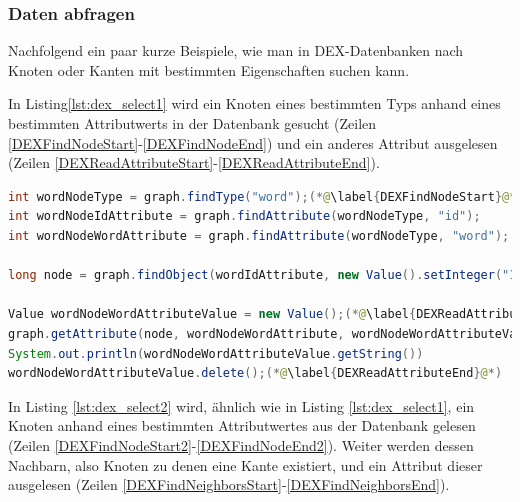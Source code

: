 \documentclass[11pt, a4paper, oneside]{article} %
\begin{document}
\subsubsection{Daten abfragen}

Nachfolgend ein paar kurze Beispiele, wie man in DEX-Datenbanken nach Knoten oder Kanten mit bestimmten Eigenschaften suchen kann.

In Listing\ref{lst:dex_select1} wird ein Knoten eines bestimmten Typs anhand eines bestimmten Attributwerts in der Datenbank gesucht (Zeilen \ref{DEXFindNodeStart}-\ref{DEXFindNodeEnd}) und ein anderes Attribut ausgelesen (Zeilen \ref{DEXReadAttributeStart}-\ref{DEXReadAttributeEnd}).

\begin{lstlisting}[caption={DEX - Daten abfragen - Knoten wiederfinden},label={lst:dex_select1},language=Java]
int wordNodeType = graph.findType("word");(*@\label{DEXFindNodeStart}@*)
int wordNodeIdAttribute = graph.findAttribute(wordNodeType, "id");
int wordNodeWordAttribute = graph.findAttribute(wordNodeType, "word");

long node = graph.findObject(wordIdAttribute, new Value().setInteger("1"));(*@\label{DEXFindNodeEnd}@*)

Value wordNodeWordAttributeValue = new Value();(*@\label{DEXReadAttributeStart}@*)
graph.getAttribute(node, wordNodeWordAttribute, wordNodeWordAttributeValue);
System.out.println(wordNodeWordAttributeValue.getString())
wordNodeWordAttributeValue.delete();(*@\label{DEXReadAttributeEnd}@*)
\end{lstlisting}

In Listing \ref{lst:dex_select2} wird, ähnlich wie in Listing \ref{lst:dex_select1}, ein Knoten anhand eines bestimmten Attributwertes aus der Datenbank gelesen (Zeilen \ref{DEXFindNodeStart2}-\ref{DEXFindNodeEnd2}). Weiter werden dessen Nachbarn, also Knoten zu denen eine Kante existiert, und ein Attribut dieser ausgelesen (Zeilen \ref{DEXFindNeighborsStart}-\ref{DEXFindNeighborsEnd}).
\end{document}
